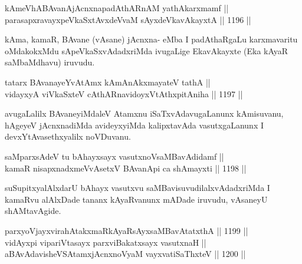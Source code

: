 
\begin{shl}
kAmeVhABAvanAjAcnxnapadAthARnAM yathAkarxmamf || \\
parasapxravayxpeVkaSxtAvxdeVvaM sAyx\footnotemark[2]deVkavAkayxtA ||  1196 ||  
\end{shl}

\begin{artha}
kAma, kamaR, BAvane (vAsane) jAcnxna- eMba I padAthaRgaLu karxmavaritu oMdakokxMdu sApeVkaSxvAdadxriMda ivugaLige EkavAkayxte (Eka kAyaR saMbaMdhavu) iruvudu.
\end{artha}


\begin{shl}
tatarx BAvanayeYvA\s \s tAmx kAmAnAkxmayateV tathA || \\
vidayxyA viVkaSxteV cAthARnavidoyxVtAthxpitAniha ||  1197 ||  
\end{shl}

\begin{artha}
avugaLalilx BAvaneyiMdaleV Atamxnu iSaTxvAdavugaLanunx kAmisuvanu, hAgeyeV jAcnxnadiMda avideyxyiMda kalipxtavAda vasutxgaLanunx I devxYtAvasethxyalilx noVDuvanu.
\end{artha}

\begin{shl}
\footnotemark[1]saMparxsAdeV tu bAhayxsayx vasutxnoV\s saMBavAdidamf || \\
kamaR nisapxnadxmeVvA\s \s setxV BAvanA\s pi ca shAmayxti ||  1198 ||  
\end{shl}

\begin{artha}
suSupitxyalAlxdarU bAhayx vasutxvu saMBavisuvudilalxvAdadxriMda I kamaRvu alAlxDade tananx kAyaRvanunx mADade iruvudu, vAsaneyU shAMtavAgide.
\end{artha}

\begin{shl}
parxyoVjayxvirahAtakxmaRkAyaRsAyxsaMBavAtatxthA ||  1199 ||  \\
vidAyx\s pi \footnotemark[2]vipariVtasayx parxviBakatxsayx vasutxnaH || \\
aBAvAdavisheVSAtamxjAcnxnoV\s yaM vayxvatiSaThxteV ||  1200 || 
\end{shl}

